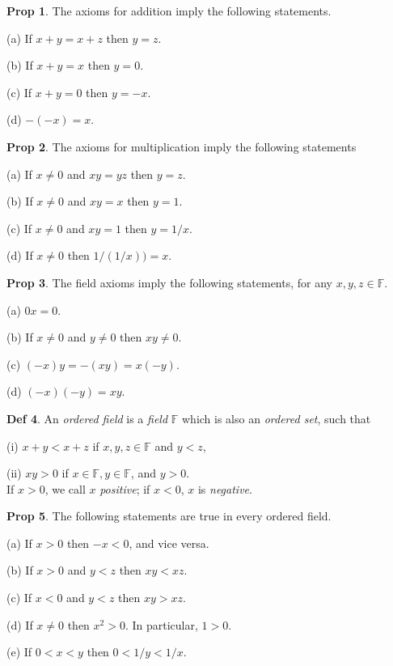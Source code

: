\documentclass{article}
\theoremstyle{definition}
\newtheorem{definition}{Def}
\newtheorem{proposition}[definition]{Prop}
\begin{document}
\begin{proposition}
    The axioms for addition imply the following statements.\par
    (a) If $x+y=x+z$ then $y=z$.\par
    (b) If $x+y=x$ then $y=0$.\par
    (c) If $x+y=0$ then $y=-x$.\par
    (d) $-(-x)=x.$
\end{proposition}
\begin{proposition}
    The axioms for multiplication imply the following statements\par
    (a) If $x\neq0$ and $xy=yz$ then $y=z$.\par
    (b) If $x\neq0$ and $xy=x$ then $y=1$.\par
    (c) If $x\neq0$ and $xy=1$ then $y=1/x$.\par
    (d) If $x\neq0$ then $1/(1/x))=x$.
\end{proposition}
\begin{proposition}
    The field axioms imply the following statements, for any $x, y, z \in \mathbb{F}$.\par
    (a) $0x=0$.\par
    (b) If $x\neq0$ and $y\neq0$ then $xy\neq0$.\par
    (c) $(-x)y=-(xy)=x(-y)$.\par
    (d) $(-x)(-y)=xy$.\par
\end{proposition}
\begin{definition}
    An \textit{ordered field} is a \textit{field} $\mathbb{F}$ which is also an \textit{ordered set}, such that\par
    (i) $x+y<x+z$ if $x, y, z \in \mathbb{F}$ and $y<z$,\par
    (ii) $xy>0$ if $x \in \mathbb{F}, y\in\mathbb{F}$, and $y>0$.\\
    If $x>0$, we call $x$ \textit{positive}; if $x<0$, $x$ is \textit{negative}.
\end{definition}
\begin{proposition}
    The following statements are true in every ordered field.\par
    (a) If $x>0$ then $-x<0$, and vice versa.\par
    (b) If $x>0$ and $y < z$ then $xy < xz$.\par
    (c) If $x<0$ and $y < z$ then $xy>xz$.\par
    (d) If $x\neq0$ then $x^2>0$. In particular, $1>0$.\par
    (e) If $0<x<y$ then $0<1/y<1/x$.
\end{proposition}
\end{document}
